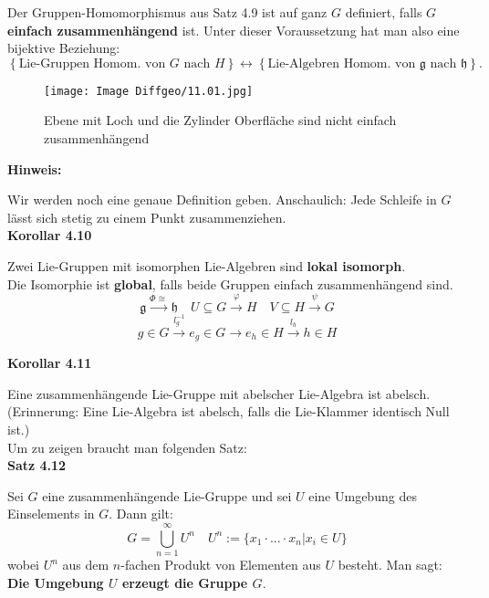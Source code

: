 \documentclass[fleqn, 12pt, letterpaper]{article}
\begin{document}
Der Gruppen-Homomorphismus aus Satz 4.9 ist auf ganz \( G \) definiert, falls \( G \) \textbf{einfach zusammenhängend} ist. Unter dieser Voraussetzung hat man also eine bijektive Beziehung:
\[
\left\{ 
    \text{Lie-Gruppen Homom. von } G \text{ nach } H 
\right\} 
\longleftrightarrow 
\left\{ 
    \text{Lie-Algebren Homom. von } \mathfrak{g} \text{ nach } \mathfrak{h} 
\right\}.
\]
  \begin{figure}[H]
    \centering
    \texttt{[image: Image Diffgeo/11.01.jpg]}
	\caption{Ebene mit Loch und die Zylinder Oberfläche sind nicht einfach zusammenhängend}
 \end{figure}

\vspace{0.5em}
\textbf{Hinweis:}

Wir werden noch eine genaue Definition geben. Anschaulich: Jede Schleife in \( G \) lässt sich stetig zu einem Punkt zusammenziehen.\\

\textbf{Korollar 4.10}

Zwei Lie-Gruppen mit isomorphen Lie-Algebren sind \textbf{lokal isomorph}. \\
Die Isomorphie ist \textbf{global}, falls beide Gruppen einfach zusammenhängend sind.
\[\mathfrak{g}\overset{\Phi\cong}{\rightarrow} \mathfrak{h}\quad U\subseteq G\overset{\varphi}{\rightarrow}H \quad V\subseteq H\overset{\psi}{\rightarrow}G\]
\[g\in G\overset{l_g^{-1}}{\rightarrow}e_g\in G\rightarrow e_h\in H \overset{l_h}{\rightarrow}h\in H\]

\textbf{Korollar 4.11}

Eine zusammenhängende Lie-Gruppe mit abelscher Lie-Algebra ist abelsch. \\
(Erinnerung: Eine Lie-Algebra ist abelsch, falls die Lie-Klammer identisch Null ist.)\\
Um zu zeigen braucht man folgenden Satz:\\

\textbf{Satz 4.12}

Sei \( G \) eine zusammenhängende Lie-Gruppe und sei \( U \) eine Umgebung des Einselements in \( G \). Dann gilt:
\[
G = \bigcup_{n=1}^\infty U^n \quad U^n:=\{x_1\cdot...\cdot x_n|x_i\in U\}
\]
wobei \( U^n \) aus dem \( n \)-fachen Produkt von Elementen aus \( U \) besteht. Man sagt: \textbf{Die Umgebung \( U \) erzeugt die Gruppe \( G \)}.\\
\end{document}
